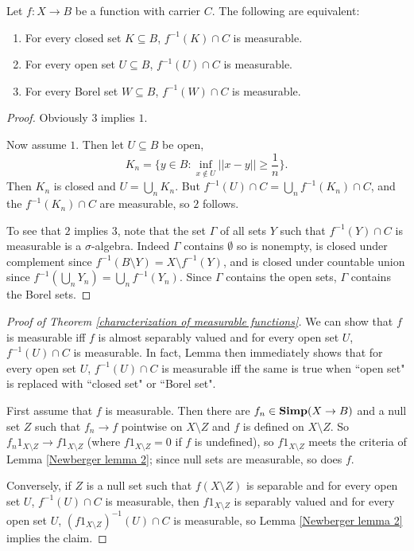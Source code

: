 \begin{lemma}
\label{Newberger lemma 3}
Let $f: X \to B$ be a function with carrier $C$. The following are equivalent:
\begin{enumerate}
\item For every closed set $K \subseteq B$, $f^{-1}(K) \cap C$ is measurable.
\item For every open set $U \subseteq B$, $f^{-1}(U) \cap C$ is measurable.
\item For every Borel set $W \subseteq B$, $f^{-1}(W) \cap C$ is measurable.
\end{enumerate}
\end{lemma}
\begin{proof}
Obviously $3$ implies $1$.

Now assume $1$. Then let $U \subseteq B$ be open,
\[K_n = \{y \in B: \inf_{x \notin U} ||x - y|| \geq \frac{1}{n}\}.\]
Then $K_n$ is closed and $U = \bigcup_n K_n$. But $f^{-1}(U) \cap C = \bigcup_n f^{-1}(K_n) \cap C$, and the $f^{-1}(K_n) \cap C$ are measurable, so $2$ follows.

To see that $2$ implies $3$, note that the set $\Gamma$ of all sets $Y$ such that $f^{-1}(Y) \cap C$ is measurable is a $\sigma$-algebra.
Indeed $\Gamma$ contains $\emptyset$ so is nonempty, is closed under complement since $f^{-1}(B \setminus Y) = X \setminus f^{-1}(Y)$, and is closed under countable union since $f^{-1}(\bigcup_n Y_n) = \bigcup_n f^{-1}(Y_n)$.
Since $\Gamma$ contains the open sets, $\Gamma$ contains the Borel sets.
\end{proof}

\begin{proof}[Proof of Theorem \ref{characterization of measurable functions}]
We can show that $f$ is measurable iff $f$ is almost separably valued and for every open set $U$, $f^{-1}(U) \cap C$ is measurable.
In fact, Lemma \label{Newberger lemma 3} then immediately shows that for every open set $U$, $f^{-1}(U) \cap C$ is measurable iff the same is true when ``open set" is replaced with ``closed set" or ``Borel set".

First assume that $f$ is measurable. Then there are $f_n \in \mathbf{Simp}(X \to B)$ and a null set $Z$ such that $f_n \to f$ pointwise on $X \setminus Z$ and $f$ is defined on $X \setminus Z$.
So $f_n1_{X \setminus Z} \to f1_{X \setminus Z}$ (where $f1_{X \setminus Z} = 0$ if $f$ is undefined), so $f1_{X \setminus Z}$ meets the criteria of Lemma \ref{Newberger lemma 2}; since null sets are measurable, so does $f$.

Conversely, if $Z$ is a null set such that $f(X \setminus Z)$ is separable and for every open set $U$, $f^{-1}(U) \cap C$ is measurable, then $f1_{X \setminus Z}$ is separably valued and for every open set $U$, $(f1_{X \setminus Z})^{-1}(U) \cap C$ is measurable, so Lemma \ref{Newberger lemma 2} implies the claim.
\end{proof}

